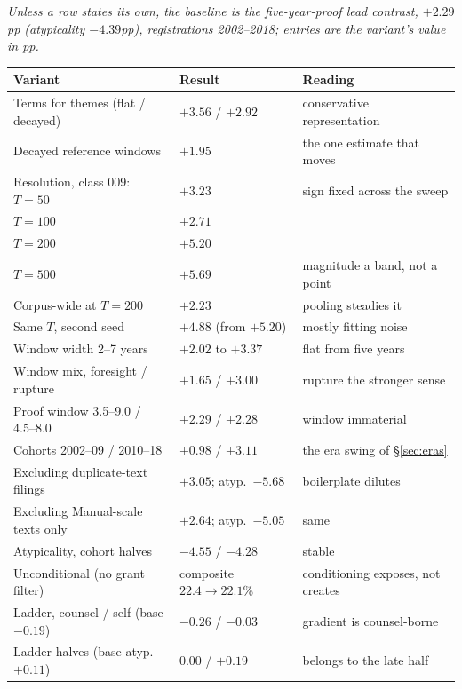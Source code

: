 \begin{center}\small
\emph{Unless a row states its own, the baseline is the five-year-proof
lead contrast, $+2.29$pp (atypicality $-4.39$pp), registrations
2002--2018; entries are the variant's value in pp.}\\[0.4em]
\begin{tabular}{lll}
\toprule
Variant & Result & Reading \\
\midrule
Terms for themes (flat / decayed) & $+3.56$ / $+2.92$ & conservative representation \\
Decayed reference windows & $+1.95$ & the one estimate that moves \\
Resolution, class 009: $T = 50$ & $+3.23$ & sign fixed across the sweep \\
\quad $T = 100$ & $+2.71$ & \\
\quad $T = 200$ & $+5.20$ & \\
\quad $T = 500$ & $+5.69$ & magnitude a band, not a point \\
Corpus-wide at $T = 200$ & $+2.23$ & pooling steadies it \\
Same $T$, second seed & $+4.88$ (from $+5.20$) & mostly fitting noise \\
Window width 2--7 years & $+2.02$ to $+3.37$ & flat from five years \\
Window mix, foresight / rupture & $+1.65$ / $+3.00$ & rupture the stronger sense \\
Proof window 3.5--9.0 / 4.5--8.0 & $+2.29$ / $+2.28$ & window immaterial \\
Cohorts 2002--09 / 2010--18 & $+0.98$ / $+3.11$ & the era swing of \S\ref{sec:eras} \\
Excluding duplicate-text filings & $+3.05$; atyp.\ $-5.68$ & boilerplate dilutes \\
Excluding Manual-scale texts only & $+2.64$; atyp.\ $-5.05$ & same \\
Atypicality, cohort halves & $-4.55$ / $-4.28$ & stable \\
Unconditional (no grant filter) & composite $22.4 \to 22.1$\% & conditioning exposes, not creates \\
Ladder, counsel / self (base $-0.19$) & $-0.26$ / $-0.03$ & gradient is counsel-borne \\
Ladder halves (base atyp.\ $+0.11$) & $0.00$ / $+0.19$ & belongs to the late half \\
\bottomrule
\end{tabular}
\end{center}


